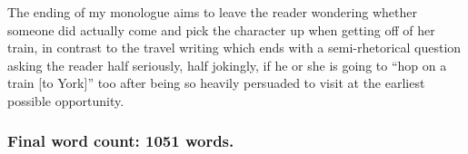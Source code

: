 \documentclass[11pt,a4paper]{article}
\begin{document}
The ending of my monologue aims to leave the reader wondering whether someone did actually come and pick the character up when getting off of her train, in contrast to the travel writing which ends with a semi-rhetorical question asking the reader half seriously, half jokingly, if he or she is going to ``hop on a train [to York]'' too after being so heavily persuaded to visit at the earliest possible opportunity.

\begin{center}
	\subsubsection*{Final word count: 1051 words.}
\end{center}
\end{document}
